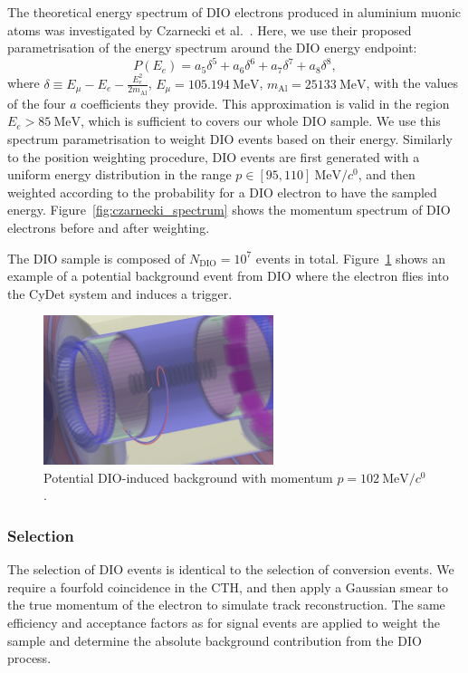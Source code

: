 The theoretical energy spectrum of DIO electrons produced in aluminium muonic
atoms was investigated by Czarnecki et al.~\cite{czarnecki}. Here, we use their
proposed parametrisation of the energy spectrum around the DIO energy endpoint:
$$
P(E_e) = a_5 \delta^5 + a_6 \delta^6 + a_7 \delta^7 + a_8 \delta^8,
$$
where $\delta \equiv E_\mu  - E_e - \frac{E_e^2}{2 m_\mathrm{Al}}$, $E_\mu =
\SI{105.194}{\MeV}$, $m_\mathrm{Al} = \SI{25133}{\MeV}$, with the values of the
four $a$ coefficients they provide. This approximation is valid in the region
$E_e > \SI{85}{\MeV}$, which is sufficient to covers our whole DIO sample. We
use this spectrum parametrisation to weight DIO events based on their energy.
Similarly to the position weighting procedure, DIO events are first generated
with a uniform energy distribution in the range $p \in [95,
110]~\si{\MeV/\clight}$, and then weighted according to the probability for a
DIO electron to have the sampled energy. Figure~\ref{fig:czarnecki_spectrum}
shows the momentum spectrum of DIO electrons before and after weighting.

The DIO sample is composed of $N_\mathrm{DIO} = 10^7$ events in total.
Figure~\ref{fig:muon_dio_in_cydet} shows an example of a potential background
event from DIO where the electron flies into the CyDet system and induces a
trigger.

\begin{figure}
    \centering
    \includegraphics[width=0.6\textwidth]{chapter6/dio_event_in_cydet.png}
    \caption{Potential DIO-induced background with momentum $p=\SI{102}{\MeV/\clight}$.}
    \label{fig:muon_dio_in_cydet}
\end{figure}

\subsubsection{Selection}
The selection of DIO events is identical to the selection of conversion events.
We require a fourfold coincidence in the CTH, and then apply a Gaussian smear to
the true momentum of the electron to simulate track reconstruction. The same
efficiency and acceptance factors as for signal events are applied to weight the
sample and determine the absolute background contribution from the DIO process.


